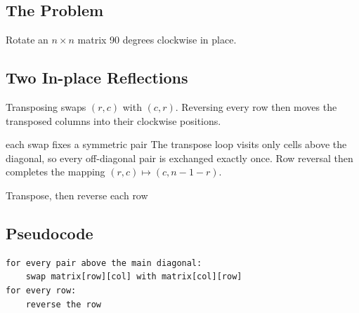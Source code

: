 \subsection{The Problem}
Rotate an \(n\times n\) matrix 90 degrees clockwise in place.

\subsection{Two In-place Reflections}
Transposing swaps \((r,c)\) with \((c,r)\). Reversing every row then moves
the transposed columns into their clockwise positions.

\begin{invariantbox}{each swap fixes a symmetric pair}
The transpose loop visits only cells above the diagonal, so every off-diagonal
pair is exchanged exactly once. Row reversal then completes the mapping
\((r,c)\mapsto(c,n-1-r)\).
\end{invariantbox}

\begin{visualbox}{Transpose, then reverse each row}
\centering
{}
\end{visualbox}

\subsection{Pseudocode}
\begin{lstlisting}[style=pseudocode]
for every pair above the main diagonal:
    swap matrix[row][col] with matrix[col][row]
for every row:
    reverse the row
\end{lstlisting}

